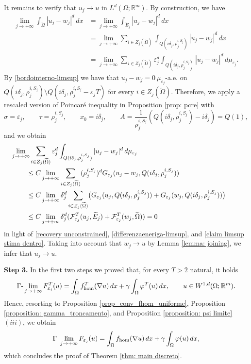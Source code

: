 \documentclass{article}
\theoremstyle{plain}
\theoremstyle{definition}
\def\rr{{\mathbb R}}
\newcommand{\f}{\varphi}
\newcommand{\ej}{\varepsilon_j}
\newcommand{\dej}{\delta_j}
\newcommand{\F}{\mathcal{F}}
\numberwithin{equation}{section}
\begin{document}
It remains to verify that $u_j\to u$ in $L^d(\Omega;\rr^m)$. By construction, we have
\begin{align*}
         \lim_{j\to+\infty}   \int_{\widetilde{\Omega}}|u_j-w_j|^{d}\,dx & = \lim_{j\to+\infty}   \int_{\widetilde{E}_j}|u_j-w_j|^{d}\,dx \\
                    &= \lim_{j\to+\infty} \sum_{i \in Z_j(\widetilde{\Omega})} \int_{Q(i\dej, \rho_j^{i,S_j})}|u_{j}-w_j|^{d}\,dx \\
                    & = \lim_{j\to+\infty} \sum_{i \in Z_j(\widetilde{\Omega})} \ej^d\int_{Q(i\dej, \rho_j^{i,S_j})}|u_{j}-w_j|^{d}\,d\mu_{\ej}.
\end{align*}
By \eqref{bordointerno-limsup} we have that $u_j-w_j=0\ \mu_{\ej}$-a.e. on $Q(i\dej,\rho_j^{i,S_j})\setminus Q(i\dej,\rho_j^{i,S_j}-\ej T)$ for every $i\in Z_j(\widetilde{\Omega})$. Therefore, we apply a rescaled version of Poincaré inequality in Proposition \ref{prop: pcre} with
\begin{equation*}
   \sigma=\ej, \qquad  \tau=\rho_j^{i,S_j}, \qquad x_0=i\dej, \qquad A=\frac{1}{\rho_j^{i,S_j}}(Q(i\delta_j,\rho_j^{i,S_j})-i\dej)=Q(1),
\end{equation*}
and we obtain
\begin{align*}
&\hspace{-0.8cm}\lim_{j\to+\infty}  \sum_{i \in Z_j(\widetilde{\Omega})}  \ej^d\int_{Q(i\dej, \rho_j^{i,S_j})}|u_{j}-w_j|^{d}\,d\mu_{\ej} \\
& \leq C\lim_{j\to+\infty}   \sum_{i \in Z_j(\widetilde{\Omega})}(\rho_j^{i,S_j})^dG_{\ej}(u_j-w_j, Q(i\dej, \rho_j^{i,S_j})) \\
    & \leq  C\lim_{j\to+\infty} \dej^d  \sum_{i \in Z_j(\widetilde{\Omega})}\bigl(G_{\ej}(u_j, Q(i\dej, \rho_j^{i,S_j}))+G_{\ej}(w_j, Q(i\dej, \rho_j^{i,S_j}))\bigr) \\
    & \leq  C \lim_{j\to+\infty}  \dej^d  (\F^T_{\ej}(u_j, \widetilde{E}_j)+\F^T_{\ej}(w_j, \widetilde{\Omega})) =0
\end{align*}
in light of \eqref{recovery unconstrained}, \eqref{differenzaeneriga-limsup}, and \eqref{claim limsup stima dentro}. Taking into account that $w_j\to u$ by Lemma \ref{lemma: joining}, we infer that $u_j\to u$.

\smallskip

{\bf Step 3.} In the first two steps we proved that, for every $T>2$ natural, it holds
\begin{equation*}
    \Gamma\text{-}\lim_{j\to+\infty} F^T_{\ej}(u) = \int_\Omega f^T_{\rm hom}(\nabla u)\,dx+\gamma\int_\Omega\f^T(u)\, dx, \qquad u\in W^{1,d}(\Omega;\rr^m).
\end{equation*}
Hence, resorting to Proposition \ref{prop_conv_fhom_uniforme},  Proposition \ref{proposition: gamma_troncamento}, and Proposition \ref{proposition: psi limite}$(iii)$, we obtain
\begin{equation*}
       \Gamma\text{-}\lim_{j\to+\infty} F_{\ej}(u) = \int_\Omega f_{\rm hom}(\nabla u)\,dx+\gamma\int_\Omega\f(u)\, dx,
\end{equation*}
which concludes the proof of Theorem \ref{thm: main discreto}.
\end{document}
